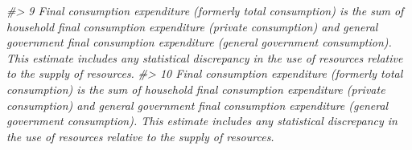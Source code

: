 \documentclass[
  xelatex, ja=standard]{bxjsbook}
\newenvironment{Shaded}{\begin{snugshade}}{\end{snugshade}}
\newcommand{\CommentTok}[1]{\textcolor[rgb]{0.56,0.35,0.01}{\textit{#1}}}
\theoremstyle{definition}
\theoremstyle{definition}
\theoremstyle{definition}
\theoremstyle{definition}
\theoremstyle{remark}
\begin{document}
\begin{Shaded}
\begin{Highlighting}[]
\CommentTok{\#\textgreater{} 9                                                                                                                                                                                                                                                                                                                                                                                                                                                                                                                                                                                                                                                                                                                                                                                                                                                                                                                                                                                                                                                                                                      Final consumption expenditure (formerly total consumption) is the sum of household final consumption expenditure (private consumption) and general government final consumption expenditure (general government consumption). This estimate includes any statistical discrepancy in the use of resources relative to the supply of resources.}
\CommentTok{\#\textgreater{} 10                                                                                                                                                                                                                                                                                                                                                                                                                                                                                                                                                                                                                                                                                                                                                                                                                                                                                                                                                                                                                                                                                                     Final consumption expenditure (formerly total consumption) is the sum of household final consumption expenditure (private consumption) and general government final consumption expenditure (general government consumption). This estimate includes any statistical discrepancy in the use of resources relative to the supply of resources.}

\end{Highlighting}
\end{Shaded}
\end{document}
